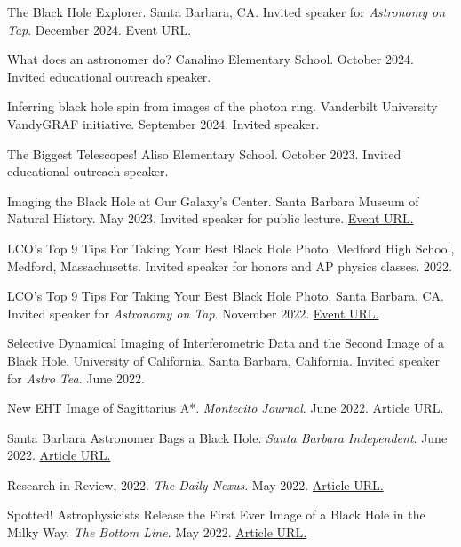 \documentclass[margin,line]{res}
\begin{document}
\begin{resume}
The Black Hole Explorer. Santa Barbara, CA. Invited speaker for \textit{Astronomy on Tap}. December 2024. {\color{blue}\href{https://lco.global/aot/december-5-2024/}{Event URL.}}

What does an astronomer do? Canalino Elementary School. October 2024. Invited educational outreach speaker. 

Inferring black hole spin from images of the photon ring. Vanderbilt University VandyGRAF initiative. September 2024. Invited speaker. 

The Biggest Telescopes! Aliso Elementary School. October 2023. Invited educational outreach speaker. 

Imaging the Black Hole at Our Galaxy's Center. Santa Barbara Museum of Natural History. May 2023. Invited speaker for public lecture. {\color{blue}\href{https://www.sbnature.org/visit/calendar/7329/free-public-astronomy-talk-imaging-the-black-hole-at-our-galaxys-center}{Event URL.}}

LCO's Top 9 Tips For Taking Your Best Black Hole Photo. Medford High School, Medford, Massachusetts. Invited speaker for honors and AP physics classes. 2022.

LCO's Top 9 Tips For Taking Your Best Black Hole Photo. Santa Barbara, CA. Invited speaker for \textit{Astronomy on Tap}. November 2022. {\color{blue}\href{https://astronomyontap.org/event/astronomy-on-tap-santa-barbara-2/}{Event URL.}}

Selective Dynamical Imaging of Interferometric Data and the Second Image of a Black Hole. University of California, Santa Barbara, California. Invited speaker for \textit{Astro Tea}. June 2022.

New EHT Image of Sagittarius A*. \textit{Montecito Journal}. June 2022. {\color{blue}\href{https://www.montecitojournal.net/2022/06/07/new-eht-image-of-sagittarius-a/}{Article URL.}}

Santa Barbara Astronomer Bags a Black Hole.
\textit{Santa Barbara Independent}. June 2022. {\color{blue}\href{https://www.independent.com/2022/05/19/santa-barbara-astronomer-bags-a-black-hole/}{Article URL.}}

Research in Review, 2022.
\textit{The Daily Nexus}. May 2022. {\color{blue}\href{https://dailynexus.com/2022-05-26/research-in-review/}{Article URL.}}

Spotted! Astrophysicists Release the First Ever Image of a Black Hole in the Milky Way.
\textit{The Bottom Line}. May 2022. {\color{blue}\href{https://thebottomline.as.ucsb.edu/2022/06/spotted-astrophysicists-release-the-first-ever-image-of-a-black-hole-in-the-milky-way}{Article URL.}}



\end{resume}
\end{document}

